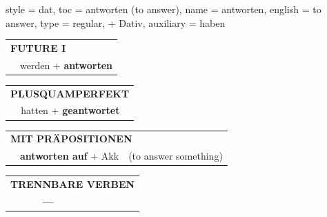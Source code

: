 \begin{verbentry}{
  style = {dat},
  toc = {antworten (to answer)},
  name = {antworten},
  english = {to answer},
  type = {regular, + Dativ},
  auxiliary = {haben}
}
\begin{tabular}{rl}
    \multicolumn{2}{l}{\textbf{FUTURE I} }\\
   & werden + \textbf{antworten}\\
 
  \end{tabular}
\hfill
   \begin{tabular}{rl}
      \multicolumn{2}{l}{\textbf{PLUSQUAMPERFEKT}}\\
   & hatten + \textbf{geantwortet}\\
  \end{tabular}


    \vspace{10pt}

\begin{tabular}{lll}
\multicolumn{3}{l}{\textbf{MIT PRÄPOSITIONEN}}\\
& \textbf{antworten auf} + Akk & (to answer something)\\
\end{tabular}
  \hfill
\begin{tabular}{lll}
\multicolumn{3}{l}{\textbf{TRENNBARE VERBEN}}\\
& \textbf{---} & \\
\end{tabular}

  \vspace{-5pt}
\end{verbentry}

